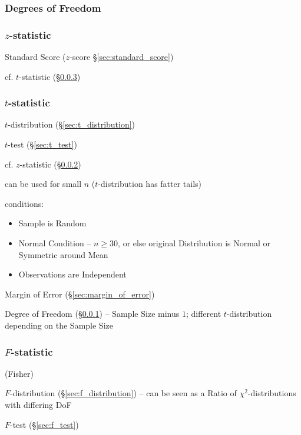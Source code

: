 \subsubsection{Degrees of Freedom}\label{sec:statistical_freedom}

\subsubsection{$z$-statistic}\label{sec:z_statistic}

Standard Score ($z$-score \S\ref{sec:standard_score})

cf. $t$-statistic (\S\ref{sec:t_statistic})



\subsubsection{$t$-statistic}\label{sec:t_statistic}

$t$-distribution (\S\ref{sec:t_distribution})

$t$-test (\S\ref{sec:t_test})

cf. $z$-statistic (\S\ref{sec:z_statistic})

can be used for small $n$ ($t$-distribution has fatter tails)

conditions:
\begin{itemize}
  \item Sample is Random
  \item Normal Condition -- $n \geq 30$, or else original Distribution is Normal
    or Symmetric around Mean
  \item Observations are Independent
\end{itemize}

Margin of Error (\S\ref{sec:margin_of_error})

Degree of Freedom (\S\ref{sec:statistical_freedom}) -- Sample Size minus $1$;
different $t$-distribution depending on the Sample Size



\subsubsection{$F$-statistic}\label{sec:f_statistic}

(Fisher)

$F$-distribution (\S\ref{sec:f_distribution}) -- can be seen as a Ratio of
$\chi^2$-distributions with differing DoF

$F$-test (\S\ref{sec:f_test})

